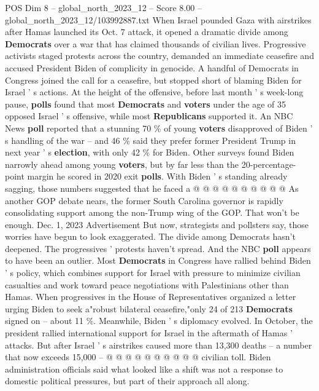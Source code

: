 \begin{textsample}{POS Dim 8 – global\_north\_2023\_12 – Score 8.00 – global\_north\_2023\_12/103992887.txt}  \label{ex:f8_pos_119}
When Israel pounded Gaza with airstrikes after Hamas launched its Oct. 7 attack, it opened a dramatic divide among \textbf{Democrats} over a war that has claimed thousands of civilian lives.
Progressive activists staged protests across the country, demanded an immediate ceasefire and accused President Biden of complicity in genocide.
A handful of Democrats in Congress joined the call for a ceasefire, but stopped short of blaming Biden for Israel ' s actions.
At the height of the offensive, before last month ' s week-long pause, \textbf{polls} found that most \textbf{Democrats} and \textbf{voters} under the age of 35 opposed Israel ' s offensive, while most \textbf{Republicans} supported it.
An NBC News \textbf{poll} reported that a stunning 70 \% of young \textbf{voters} disapproved of Biden ' s handling of the war -- and 46 \% said they prefer former President Trump in next year ' s \textbf{election}, with only 42 \% for Biden.
Other surveys found Biden narrowly ahead among young \textbf{voters}, but by far less than the 20-percentage-point margin he scored in 2020 exit \textbf{polls}.
With Biden ' s standing already sagging, those numbers suggested that he faced a @ @ @ @ @ @ @ @ @ @ As another GOP debate nears, the former South Carolina governor is rapidly consolidating support among the non-Trump wing of the GOP.
That won't be enough.
Dec. 1, 2023 Advertisement But now, strategists and pollsters say, those worries have begun to look exaggerated.
The divide among Democrats hasn't deepened.
The progressives ' protests haven't spread.
And the NBC \textbf{poll} appears to have been an outlier.
Most \textbf{Democrats} in Congress have rallied behind Biden ' s policy, which combines support for Israel with pressure to minimize civilian casualties and work toward peace negotiations with Palestinians other than Hamas.
When progressives in the House of Representatives organized a letter urging Biden to seek a"robust bilateral ceasefire,"only 24 of 213 \textbf{Democrats} signed on -- about 11 \%.
Meanwhile, Biden ' s diplomacy evolved.
In October, the president rallied international support for Israel in the aftermath of Hamas ' attacks.
But after Israel ' s airstrikes caused more than 13,300 deaths -- a number that now exceeds 15,000 -- @ @ @ @ @ @ @ @ @ @ civilian toll.
Biden administration officials said what looked like a shift was not a response to domestic political pressures, but part of their approach all along.

\end{textsample}
